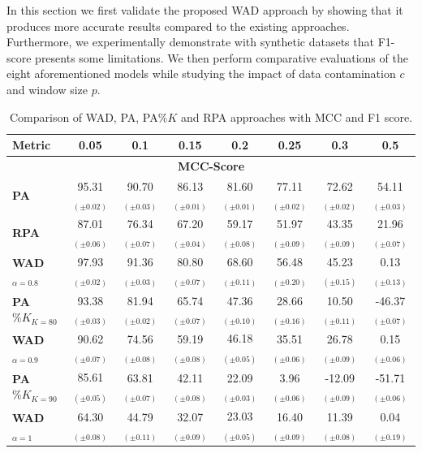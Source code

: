 

In this section we first validate the proposed WAD approach by showing that it produces more accurate results compared to the existing approaches. Furthermore, we experimentally demonstrate with synthetic datasets that F1-score presents some limitations. We then perform comparative evaluations of the eight aforementioned models while studying the impact of data contamination $c$ and window size $p$.


\begin{table}[!t]
    \caption{Comparison of WAD, PA, PA$\%K$ and RPA approaches with MCC and F1 score.}
    \label{tab:chap_3:wad_vs_rpa}
    \setlength\tabcolsep{2pt} 
    \small
    
    \begin{tabular*}{\hsize}{@{\extracolsep{\fill}} lccccccc}
    \toprule
    \bf Metric & \bf 0.05 & \bf 0.1 & \bf 0.15 & \bf 0.2 & \bf 0.25 & \bf 0.3 & \bf 0.5 \\
    \midrule
    \multicolumn{8}{c}{\bf MCC-Score} \\
    \midrule
    \bf PA & 95.31$_{(\pm0.02)}$ & 90.70$_{(\pm0.03)}$ & 86.13$_{(\pm0.01)}$ & 81.60$_{(\pm0.01)}$ & 77.11$_{(\pm0.02)}$ & 72.62$_{(\pm0.02)}$ & 54.11$_{(\pm0.03)}$ \\
    \bf RPA & 87.01$_{(\pm0.06)}$ & 76.34$_{(\pm0.07)}$ & 67.20$_{(\pm0.04)}$ & 59.17$_{(\pm0.08)}$ & 51.97$_{(\pm0.09)}$ & 43.35$_{(\pm0.09)}$ & 21.96$_{(\pm0.07)}$ \\
    \bf WAD$_{\alpha=0.8}$ & 97.93$_{(\pm0.02)}$ & 91.36$_{(\pm0.03)}$ & 80.80$_{(\pm0.07)}$ & 68.60$_{(\pm0.11)}$ & 56.48$_{(\pm0.20)}$ & 45.23$_{(\pm0.15)}$ & 0.13$_{(\pm0.13)}$ \\
    \bf PA$\%K_{K=80}$ & 93.38$_{(\pm0.03)}$ & 81.94$_{(\pm0.02)}$ & 65.74$_{(\pm0.07)}$ & 47.36$_{(\pm0.10)}$ & 28.66$_{(\pm0.16)}$ & 10.50$_{(\pm0.11)}$ & -46.37$_{(\pm0.07)}$ \\
    \bf WAD$_{\alpha=0.9}$ & 90.62$_{(\pm0.07)}$ & 74.56$_{(\pm0.08)}$ & 59.19$_{(\pm0.08)}$ & 46.18$_{(\pm0.05)}$ & 35.51$_{(\pm0.06)}$ & 26.78$_{(\pm0.09)}$ & 0.15$_{(\pm0.06)}$ \\
    \bf PA$\%K_{K=90}$ & 85.61$_{(\pm0.05)}$ & 63.81$_{(\pm0.07)}$ & 42.11$_{(\pm0.08)}$ & 22.09$_{(\pm0.03)}$ & 3.96$_{(\pm0.06)}$ & -12.09$_{(\pm0.09)}$ & -51.71$_{(\pm0.06)}$ \\
    \bf WAD$_{\alpha=1}$ & 64.30$_{(\pm0.08)}$ & 44.79$_{(\pm0.11)}$ & 32.07$_{(\pm0.09)}$ & 23.03$_{(\pm0.05)}$ & 16.40$_{(\pm0.09)}$ & 11.39$_{(\pm0.08)}$ & 0.04$_{(\pm0.19)}$ \\

\end{tabular*}
\end{table}
